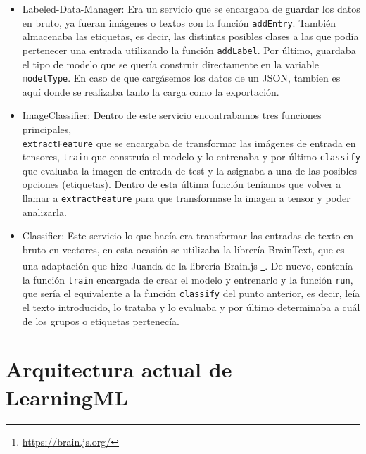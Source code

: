 \documentclass[a4paper, 12pt]{book}
\begin{document}
\begin{itemize}
  
	\item Labeled-Data-Manager: Era un servicio que se encargaba de guardar los datos en bruto, ya fueran imágenes o textos con la función \texttt{addEntry}. También almacenaba las etiquetas, es decir, las distintas posibles clases a las que podía pertenecer una entrada utilizando la función \texttt{addLabel}. Por último, guardaba el tipo de modelo que se quería construir directamente en la variable \texttt{modelType}. En caso de que cargásemos los datos de un JSON, tambíen es aquí donde se realizaba tanto la carga como la exportación.
 
	\item ImageClassifier: Dentro de este servicio encontrabamos tres funciones principales, \\ \texttt{extractFeature} que se encargaba de transformar las imágenes de entrada en tensores, \texttt{train} que construía el modelo y lo entrenaba y por último \texttt{classify} que evaluaba la imagen de entrada de test y la asignaba a una de las posibles opciones (etiquetas). Dentro de esta última función teníamos que volver a llamar a \texttt{extractFeature} para que transformase la imagen a tensor y poder analizarla.

	\item Classifier: Este servicio lo que hacía era transformar las entradas de texto en bruto en vectores, en esta ocasión se utilizaba la librería BrainText, que es una adaptación que hizo Juanda de la librería Brain.js \footnote{\url{https://brain.js.org/}}. De nuevo, contenía la función \texttt{train} encargada de crear el modelo y entrenarlo y la función \texttt{run}, que sería el equivalente a la función  \texttt{classify} del punto anterior, es decir, leía el texto introducido, lo trataba y lo evaluaba y por último determinaba a cuál de los grupos o etiquetas pertenecía.

\end{itemize}

\section{Arquitectura actual de LearningML} 
\label{sec:arquitecturaactual}
\end{document}
